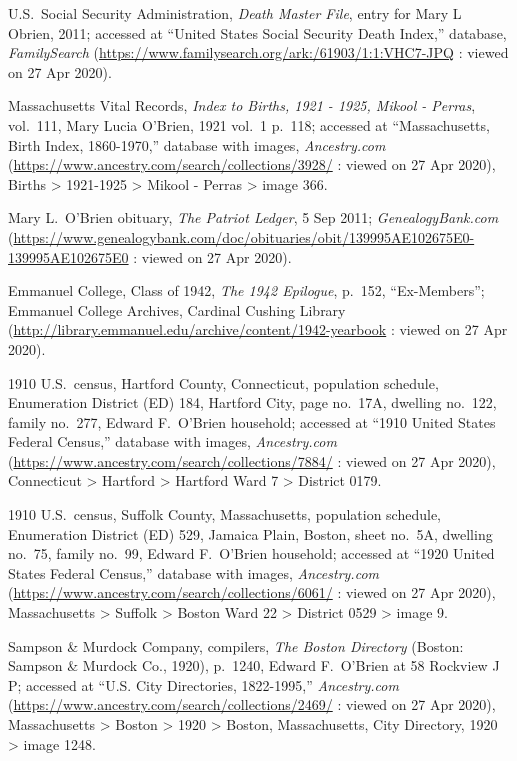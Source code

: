 \begin{thebibliography}{999}
	U.S.\ Social Security Administration, \textit{Death Master File}, entry for Mary L Obrien, 2011; accessed at ``United States Social Security Death Index,'' database, \textit{FamilySearch} (\url{https://www.familysearch.org/ark:/61903/1:1:VHC7-JPQ} : viewed on 27 Apr 2020).
	
	Massachusetts Vital Records, \textit{Index to Births, 1921 - 1925, Mikool - Perras}, vol.\ 111, Mary Lucia O'Brien, 1921 vol.\ 1 p.\ 118; accessed at ``Massachusetts, Birth Index, 1860-1970,'' database with images, \textit{Ancestry.com} (\url{https://www.ancestry.com/search/collections/3928/} : viewed on 27 Apr 2020), Births > 1921-1925 > Mikool - Perras > image 366.
	
	Mary L.\ O'Brien obituary, \textit{The Patriot Ledger}, 5 Sep 2011; \textit{GenealogyBank.com} (\url{https://www.genealogybank.com/doc/obituaries/obit/139995AE102675E0-139995AE102675E0} : viewed on 27 Apr 2020).
	
	Emmanuel College, Class of 1942, \textit{The 1942 Epilogue}, p.\ 152, ``Ex-Members''; Emmanuel College Archives, Cardinal Cushing Library (\url{http://library.emmanuel.edu/archive/content/1942-yearbook} : viewed on 27 Apr 2020).
	
	1910 U.S.\ census, Hartford County, Connecticut, population schedule, Enumeration District (ED) 184, Hartford City, page no.\ 17A, dwelling no.\ 122, family no.\ 277, Edward F.\ O'Brien household; accessed at ``1910 United States Federal Census,'' database with images, \textit{Ancestry.com} (\url{https://www.ancestry.com/search/collections/7884/} : viewed on 27 Apr 2020), Connecticut > Hartford > Hartford Ward 7 > District 0179.
	
	1910 U.S.\ census, Suffolk County, Massachusetts, population schedule, Enumeration District (ED) 529, Jamaica Plain, Boston, sheet no.\ 5A, dwelling no.\ 75, family no.\ 99, Edward F.\ O'Brien household; accessed at ``1920 United States Federal Census,'' database with images, \textit{Ancestry.com} (\url{https://www.ancestry.com/search/collections/6061/} : viewed on 27 Apr 2020), Massachusetts > Suffolk > Boston Ward 22 > District 0529 > image 9.
	
	Sampson \& Murdock Company, compilers, \textit{The Boston Directory} (Boston: Sampson \& Murdock Co., 1920), p.\ 1240, Edward F.\ O'Brien at 58 Rockview J P; accessed at ``U.S. City Directories, 1822-1995,'' \textit{Ancestry.com} (\url{https://www.ancestry.com/search/collections/2469/} : viewed on 27 Apr 2020), Massachusetts > Boston > 1920 > Boston, Massachusetts, City Directory, 1920 > image 1248.
	

\end{thebibliography}

